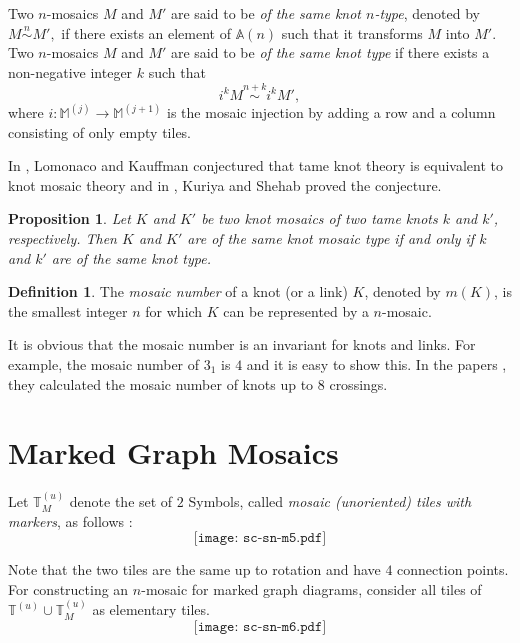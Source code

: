 \documentclass{article}
\newtheorem{proposition}[theorem]{Proposition}
\theoremstyle{definition}
\newtheorem{definition}{Definition}
\begin{document}
Two $n$-mosaics $M$ and $M'$ are said to be \textit{of the same knot $n$-type}, denoted by 
  $M \overset{n}{\sim} M',$
  if there exists an element of $\mathbb{A}(n)$ such that it transforms $M$ into $M'$.
Two $n$-mosaics $M$ and $M'$ are said to be \textit{of the same knot type} 
  if there exists a non-negative integer $k$ such that 
  $$i^{k}M \overset{n+k}{\sim} i^{k}M',$$
  where $i : \mathbb{M}^{(j)} \rightarrow \mathbb{M}^{(j+1)}$ is the mosaic injection by adding a row and a column consisting of only empty tiles.
  
In \cite{LK}, Lomonaco and Kauffman conjectured that tame knot theory is equivalent to knot mosaic theory and in \cite{KS}, Kuriya and Shehab proved the conjecture. 

\begin{proposition}
Let $K$ and $K'$ be two knot mosaics of two tame knots $k$ and $k'$, respectively. 
Then $K$ and $K'$ are of the same knot mosaic type if and only if $k$ and $k'$ are of the same knot type.
\end{proposition}

\begin{definition}
The \textit{mosaic number} of a knot (or a link) $K$, denoted by $m(K)$, is the smallest integer $n$ for which $K$ can be represented by a $n$-mosaic.
\end{definition} 

It is obvious that the mosaic number is an invariant for knots and links. For example, the mosaic number of $3_1$ is $4$ and it is easy to show this. In the papers \cite{OHLL, LLPP}, they calculated the mosaic number of knots up to $8$ crossings.




\section{\large\textbf{Marked Graph Mosaics}}\label{MGM}

Let $\mathbb{T}^{(u)}_{M}$ denote the set of $2$ Symbols, called \textit{mosaic (unoriented) tiles with markers}, as follows : 
\[\texttt{[image: sc-sn-m5.pdf]}\]

Note that the two tiles are the same up to rotation and have $4$ connection points. 
For constructing an $n$-mosaic for marked graph diagrams, consider all tiles of $\mathbb{T}^{(u)}\cup \mathbb{T}^{(u)}_{M}$ as elementary tiles.
\[\texttt{[image: sc-sn-m6.pdf]}\]
\end{document}
